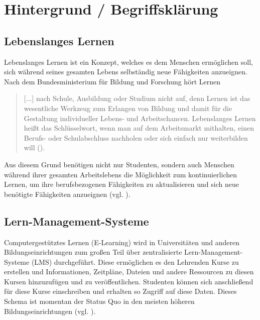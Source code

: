 \chapter{Hintergrund / Begriffsklärung} 
\label{chapter:Kapitel2}

\section{Lebenslanges Lernen}
Lebenslanges Lernen ist ein Konzept, welches es dem Menschen ermöglichen soll, sich während seines gesamten Lebens selbständig neue Fähigkeiten anzueignen. Nach dem Bundesministerium für Bildung und Forschung hört Lernen \begin{quotation}
 [...] nach Schule, Ausbildung oder Studium nicht auf, denn Lernen ist das wesentliche Werkzeug zum Erlangen von Bildung und damit für die Gestaltung individueller Lebens- und Arbeitschancen. Lebenslanges Lernen heißt das Schlüsselwort, wenn man auf dem Arbeitsmarkt mithalten, einen Berufs- oder Schulabschluss nachholen oder sich einfach nur weiterbilden will (\cite{BMBF2008}).
\end{quotation}
Aus diesem Grund benötigen nicht nur Studenten, sondern auch Menschen während ihrer gesamten Arbeitslebens die Möglichkeit zum kontinuierlichen Lernen, um ihre berufsbezogenen Fähigkeiten zu aktualisieren und sich neue benötigte Fähigkeiten anzueignen (vgl. \cite{Attwell2007}).

\section{Lern-Management-Systeme}\label{section:lms}
Computergestütztes Lernen (E-Learning) wird in Universitäten und anderen Bildungseinrichtungen zum großen Teil über zentralisierte Lern-Management-Systeme (LMS) durchgeführt. Diese ermöglichen es den Lehrenden Kurse zu erstellen und Informationen, Zeitpläne, Dateien und andere Ressourcen zu diesen Kursen hinzuzufügen und zu veröffentlichen. Studenten können sich anschließend für diese Kurse einschreiben und erhalten so Zugriff auf diese Daten. Dieses Schema ist momentan der Status Quo in den meisten höheren Bildungseinrichtungen (vgl. \cite{Mott2010}). 

